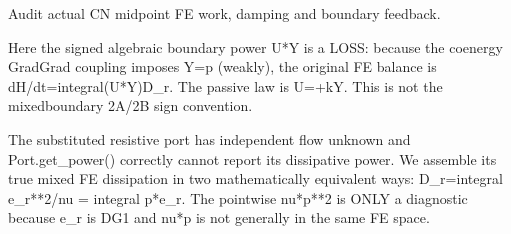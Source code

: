 \documentclass[letterpaper,10pt,english]{sphinxmanual}
\begin{document}
\begin{fulllineitems}
\label{\detokenize{examples/wave_coenergy:examples.wave_coenergy.main}}
\pysigstartsignatures
\pysiglinewithargsret
{}
{}
{}
\pysigstopsignatures
\end{fulllineitems}


\begin{fulllineitems}
\label{\detokenize{examples/wave_coenergy:examples.wave_coenergy.measure_coenergy}}
\pysigstartsignatures
\pysiglinewithargsret
{}
{}
{}
\pysigstopsignatures
\sphinxAtStartPar
Audit actual CN midpoint FE work, damping and boundary feedback.

\sphinxAtStartPar
Here the signed algebraic boundary power U*Y is a LOSS: because
the coenergy Grad\sphinxhyphen{}Grad coupling imposes Y=\sphinxhyphen{}p (weakly), the original
FE balance is dH/dt=\sphinxhyphen{}integral(U*Y)\sphinxhyphen{}D\_r. The passive law is U=+kY.
This is not the mixed\sphinxhyphen{}boundary 2A/2B sign convention.

\sphinxAtStartPar
The substituted resistive port has  independent flow unknown and
Port.get\_power() correctly cannot report its dissipative power.
We assemble its true mixed FE dissipation in two mathematically
equivalent ways: D\_r=integral e\_r**2/nu = \sphinxhyphen{}integral p*e\_r.
The pointwise nu*p**2 is ONLY a diagnostic because e\_r is DG1 and
nu*p is not generally in the same FE space.

\end{fulllineitems}

\end{document}
